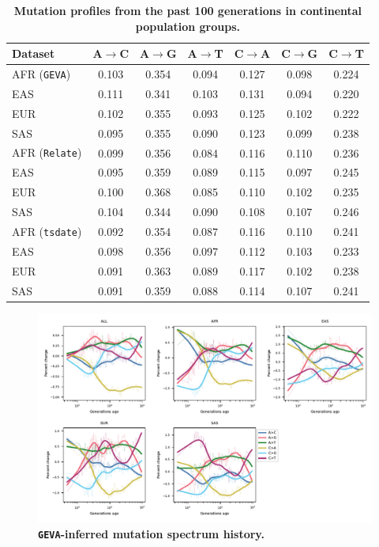 \documentclass[]{article}
\newcommand{\GEVA}{\texttt{GEVA}\xspace}
\newcommand{\tsdate}{\texttt{tsdate}\xspace}
\newcommand{\relate}{\texttt{Relate}\xspace}
\begin{document}
\begin{table}[h]
    \centering
    \begin{tabular}[t]{l|cccccc}
        \toprule
        Dataset & A$\rightarrow$C & A$\rightarrow$G & A$\rightarrow$T &
            C$\rightarrow$A & C$\rightarrow$G & C$\rightarrow$T \\
        \midrule
        AFR (\GEVA) & 0.103 & 0.354 & 0.094 & 0.127 & 0.098 & 0.224 \\
        EAS & 0.111 & 0.341 & 0.103 & 0.131 & 0.094 & 0.220 \\
        EUR & 0.102 & 0.355 & 0.093 & 0.125 & 0.102 & 0.222 \\
        SAS & 0.095 & 0.355 & 0.090 & 0.123 & 0.099 & 0.238 \\
        \midrule
        AFR (\relate) & 0.099 & 0.356 & 0.084 & 0.116 & 0.110 & 0.236 \\
        EAS & 0.095 & 0.359 & 0.089 & 0.115 & 0.097 & 0.245 \\
        EUR & 0.100 & 0.368 & 0.085 & 0.110 & 0.102 & 0.235 \\
        SAS & 0.104 & 0.344 & 0.090 & 0.108 & 0.107 & 0.246 \\
        \midrule
        AFR (\tsdate) & 0.092 & 0.354 & 0.087 & 0.116 & 0.110 & 0.241 \\
        EAS & 0.098 & 0.356 & 0.097 & 0.112 & 0.103 & 0.233 \\
        EUR & 0.091 & 0.363 & 0.089 & 0.117 & 0.102 & 0.238 \\
        SAS & 0.091 & 0.359 & 0.088 & 0.114 & 0.107 & 0.241 \\
        \bottomrule
    \end{tabular}
    \caption{
        \label{tab:population-spectra}
        \textbf{Mutation profiles from the past 100 generations in continental
        population groups.}
    }
\end{table}



\begin{figure}[ht!]
    \centering
    \includegraphics[width=\textwidth]{../plots/spectrum_history.geva.max_age.10000.pdf}
    \caption{
        \textbf{\GEVA-inferred mutation spectrum history.}
    }
    \label{fig:geva-spectra}
\end{figure}
\end{document}
